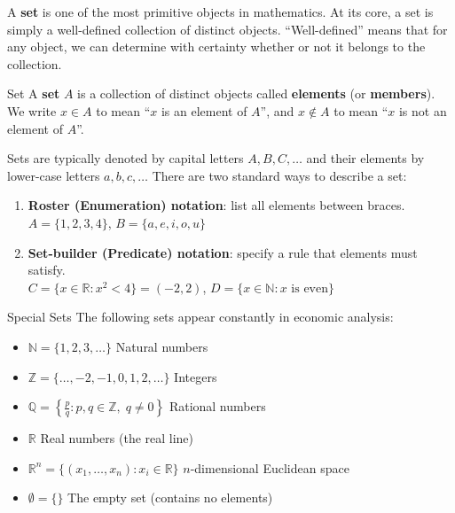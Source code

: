 \documentclass[12pt, a4paper]{article}
\theoremstyle{definition}
\newcommand{\R}{\mathbb{R}}
\newcommand{\N}{\mathbb{N}}
\newcommand{\Z}{\mathbb{Z}}
\newcommand{\Q}{\mathbb{Q}}
\begin{document}
A \textbf{set} is one of the most primitive objects in mathematics. At its core, a set is simply a well-defined collection of distinct objects. ``Well-defined'' means that for any object, we can determine with certainty whether or not it belongs to the collection.

\begin{defbox}{Set}
A \textbf{set} $A$ is a collection of distinct objects called \textbf{elements} (or \textbf{members}). We write $x \in A$ to mean ``$x$ is an element of $A$'', and $x \notin A$ to mean ``$x$ is not an element of $A$''.
\end{defbox}

Sets are typically denoted by capital letters $A, B, C, \ldots$ and their elements by lower-case letters $a, b, c, \ldots$ There are two standard ways to describe a set:

\begin{enumerate}
  \item \textbf{Roster (Enumeration) notation}: list all elements between braces.\\
    $A = \{1, 2, 3, 4\}$, \quad $B = \{a, e, i, o, u\}$
  \item \textbf{Set-builder (Predicate) notation}: specify a rule that elements must satisfy.\\
    $C = \{x \in \R : x^2 < 4\} = (-2, 2)$, \quad $D = \{x \in \N : x \text{ is even}\}$
\end{enumerate}

\begin{defbox}{Special Sets}
The following sets appear constantly in economic analysis:
\begin{itemize}
  \item $\N = \{1, 2, 3, \ldots\}$ \hfill Natural numbers
  \item $\Z = \{\ldots, -2, -1, 0, 1, 2, \ldots\}$ \hfill Integers
  \item $\Q = \left\{\frac{p}{q} : p, q \in \Z,\; q \neq 0\right\}$ \hfill Rational numbers
  \item $\R$ \hfill Real numbers (the real line)
  \item $\R^n = \{(x_1, \ldots, x_n) : x_i \in \R\}$ \hfill $n$-dimensional Euclidean space
  \item $\emptyset = \{\}$ \hfill The empty set (contains no elements)
\end{itemize}
\end{defbox}
\end{document}
